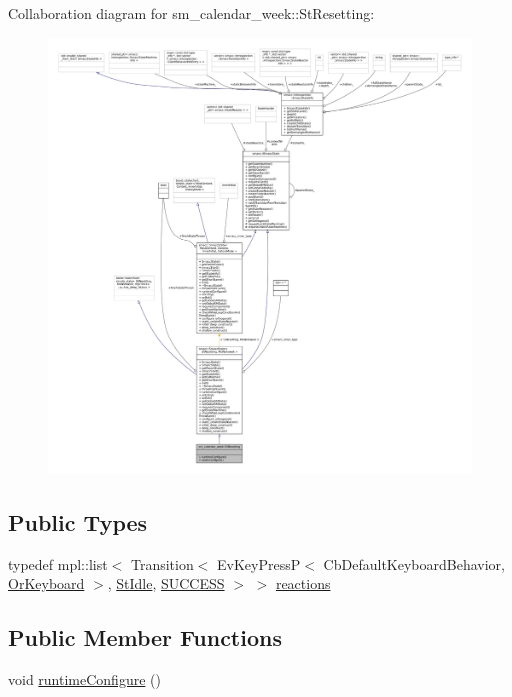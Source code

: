 Collaboration diagram for sm\+\_\+calendar\+\_\+week\+:\+:St\+Resetting\+:
\nopagebreak
\begin{figure}[H]
\begin{center}
\leavevmode
\includegraphics[width=350pt]{structsm__calendar__week_1_1StResetting__coll__graph}
\end{center}
\end{figure}
\subsection*{Public Types}
\begin{DoxyCompactItemize}
\item 
typedef mpl\+::list$<$ Transition$<$ Ev\+Key\+PressP$<$ Cb\+Default\+Keyboard\+Behavior, \hyperlink{classsm__calendar__week_1_1OrKeyboard}{Or\+Keyboard} $>$, \hyperlink{structsm__calendar__week_1_1StIdle}{St\+Idle}, \hyperlink{classSUCCESS}{S\+U\+C\+C\+E\+SS} $>$ $>$ \hyperlink{structsm__calendar__week_1_1StResetting_a5e82475dad4415094786753e2c71ad67}{reactions}
\end{DoxyCompactItemize}
\subsection*{Public Member Functions}
\begin{DoxyCompactItemize}
\item 
void \hyperlink{structsm__calendar__week_1_1StResetting_a006e7f22ae95910d4416301a3db08997}{runtime\+Configure} ()
\end{DoxyCompactItemize}
